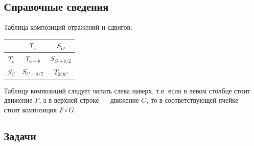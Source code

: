 
\subsection*{Справочные сведения}


Таблица композиций отражений и сдвигов:
\begin{center}
\begin{tabular}{c|c|c|}
  & $T_a$ & $S_O$ \\
 \hline
$T_b$ & $T_{a+b}$ & $S_{O+b/2}$ \\
 \hline
$S_C$ & $S_{C-a/2}$ & $T_{2OC}$ \\
\hline
\end{tabular}
\end{center}

Таблицу композиций следует читать слева наверх, т.е. если в левом столбце стоит движение $F$, а в верхней строке --- движение $G$, то в соответствующей ячейке стоит композиция $F\circ G$.


\subsection*{Задачи}

